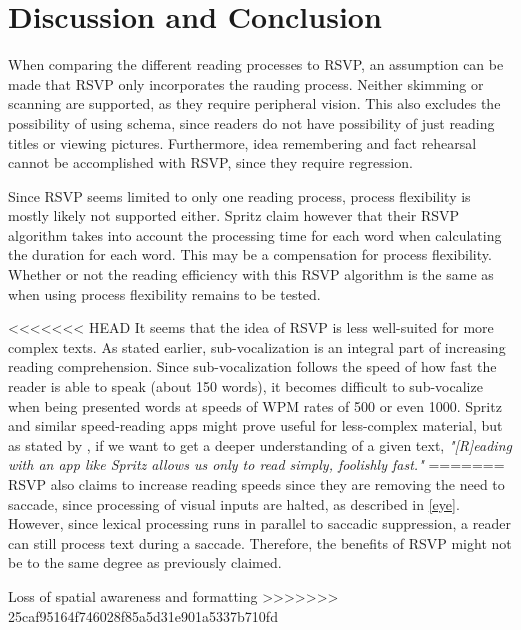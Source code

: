 \section{Discussion and Conclusion}
When comparing the different reading processes to RSVP, an assumption can be made that RSVP only incorporates the rauding process. Neither skimming or scanning are supported, as they require peripheral vision. This also excludes the possibility of using schema, since readers do not have possibility of just reading titles or viewing pictures. Furthermore, idea remembering and fact rehearsal cannot be accomplished with RSVP, since they require regression. 

Since RSVP seems limited to only one reading process, process flexibility is mostly likely not supported either. Spritz claim however that their RSVP algorithm takes into account the processing time for each word when calculating the duration for each word. This may be a compensation for process flexibility. Whether or not the reading efficiency with this RSVP algorithm is the same as when using process flexibility remains to be tested.

<<<<<<< HEAD
It seems that the idea of RSVP is less well-suited for more complex texts. As stated earlier, sub-vocalization is an integral part of increasing reading comprehension. Since sub-vocalization follows the speed of how fast the reader is able to speak (about 150 words), it becomes difficult to sub-vocalize when being presented words at speeds of WPM rates of 500 or even 1000. Spritz and similar speed-reading apps might prove useful for less-complex material, but as stated by , if we want to get a deeper understanding of a given text, \emph{"[R]eading with an app like Spritz allows us only to read simply, foolishly fast."}
=======
RSVP also claims to increase reading speeds since they are removing the need to saccade, since processing of visual inputs are halted, as described in \ref{eye}. However, since lexical processing runs in parallel 
to saccadic suppression, a reader can still process text during a saccade. Therefore, the benefits of RSVP might not be to the same degree as previously claimed.

Loss of spatial awareness and formatting
>>>>>>> 25caf95164f746028f85a5d31e901a5337b710fd
